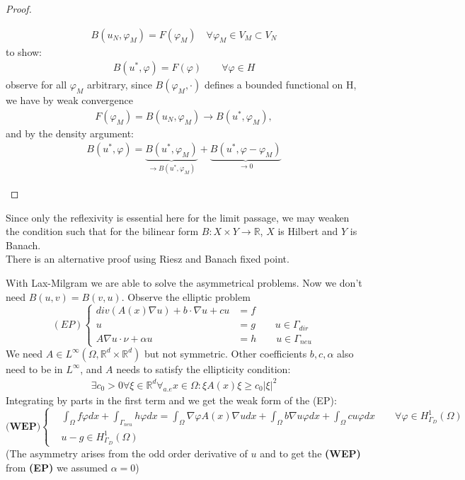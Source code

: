 \begin{proof}
\begin{itemize}
\begin{align*}
	B(u_N, \varphi_M) = F(\varphi_M) \quad \forall \varphi_M \in V_M \subset V_N
\end{align*}
to show:
\begin{align*}
	B(u^*, \varphi) = F(\varphi) \qquad \forall \varphi \in H
\end{align*}
observe for all $\varphi_M$ arbitrary, since $B(\varphi_M, \cdot)$ defines a bounded functional on H, we have by weak convergence
\begin{align*}
	F(\varphi_M) = B(u_N, \varphi_M) \longrightarrow B(u^*, \varphi_M),
\end{align*}
and by the density argument:
\begin{align*}
	B(u^*, \varphi) = \underbrace{ B(u^*, \varphi_M)}_{\rightarrow B(u^*, \varphi_M) } + \underbrace{ B(u^*, \varphi - \varphi_M)}_{\rightarrow 0}
\end{align*}
\end{itemize}
\end{proof}
\begin{remark}
Since only the reflexivity is essential here for the limit passage, we may weaken the condition such that for the bilinear form $B: X \times Y \rightarrow \mathbb{R}$, $X$ is Hilbert and $Y$ is Banach.\\
There is an alternative proof using Riesz and Banach fixed point. 	
\end{remark}



With Lax-Milgram we are able to solve the asymmetrical problems. Now we don't need $B(u, v) = B(v, u)$. Observe the elliptic problem
\begin{equation}\label{EP}
(EP)\left\{
\begin{aligned}
	div(A(x)\nabla u) + b\cdot \nabla u + cu &= f \\
	u &= g \qquad u \in \Gamma_{dir}\\
	A\nabla u \cdot \nu + \alpha u &= h \qquad u \in \Gamma_{neu}
\end{aligned}
\right.
\end{equation}
We need $A \in L^\infty(\Omega, \mathbb{R}^d \times \mathbb{R}^d)$ but not symmetric. Other coefficients $b, c, \alpha$ also need to be in $L^\infty$, and $A$ needs to satisfy the ellipticity condition:
\begin{align*}
	\exists c_0 > 0 \forall \xi \in \mathbb{R}^d \forall_{a.e} x \in \Omega: \xi A(x) \xi \geq c_0 |\xi|^2
\end{align*} 
Integrating by parts in the first term and we get the weak form of the (EP):
\begin{equation}\label{EP:WEP}
\textbf{(WEP)}\left\{
\begin{aligned}
	&\int_\Omega f\varphi dx + \int_{\Gamma_{neu}} h \varphi dx = \int_\Omega \nabla\varphi A(x)\nabla u dx + \int_\Omega b\nabla u \varphi dx + \int_\Omega cu \varphi dx \qquad \forall \varphi \in H^1_{\Gamma_D}(\Omega) \\
	&u - g \in H^1_{\Gamma_{D}}(\Omega)
\end{aligned}
\right.	
\end{equation}
(The asymmetry arises from the odd order derivative of $u$ and to get the \textbf{(WEP)} from \textbf{(EP)} we assumed $\alpha = 0$) 


